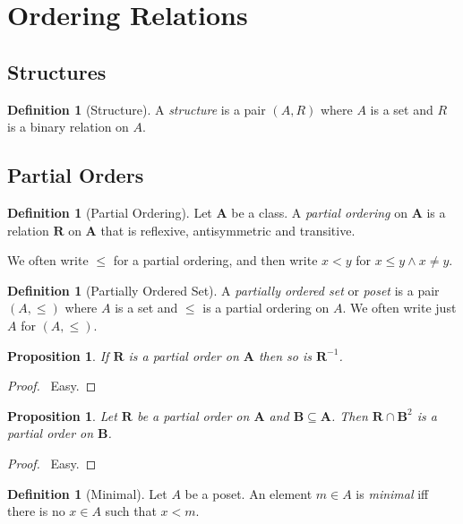 \documentclass{book}
\let\qed\relax
\newtheorem{prop}[ax]{Proposition}
\theoremstyle{definition}
\newtheorem{df}[ax]{Definition}
\begin{document}
\section{Ordering Relations}

\subsection{Structures}

\begin{df}[Structure]
A \emph{structure} is a pair $(A,R)$ where $A$ is a set and $R$ is a binary relation on $A$.
\end{df}

\subsection{Partial Orders}

\begin{df}[Partial Ordering]
Let $\mathbf{A}$ be a class. A \emph{partial ordering} on $\mathbf{A}$ is a relation $\mathbf{R}$ on $\mathbf{A}$ that is reflexive, antisymmetric and transitive.

We often write $\leq$ for a partial ordering, and then write $x < y$ for $x \leq y \wedge x \neq y$.
\end{df}

\begin{df}[Partially Ordered Set]
A \emph{partially ordered set} or \emph{poset} is a pair $(A, \leq)$ where $A$ is a set and $\leq$ is a partial ordering on $A$. We often write just $A$ for $(A, \leq)$.
\end{df}

\begin{prop}
If $\mathbf{R}$ is a partial order on $\mathbf{A}$ then so is $\mathbf{R}^{-1}$.
\end{prop}

\begin{proof}
\pf\ Easy. \qed
\end{proof}

\begin{prop}
Let $\mathbf{R}$ be a partial order on $\mathbf{A}$ and $\mathbf{B} \subseteq \mathbf{A}$. Then $\mathbf{R} \cap \mathbf{B}^2$ is a partial order on $\mathbf{B}$.
\end{prop}

\begin{proof}
\pf\ Easy. \qed
\end{proof}

\begin{df}[Minimal]
Let $A$ be a poset. An element $m \in A$ is \emph{minimal} iff there is no $x \in A$ such that $x < m$.
\end{df}
\end{document}

